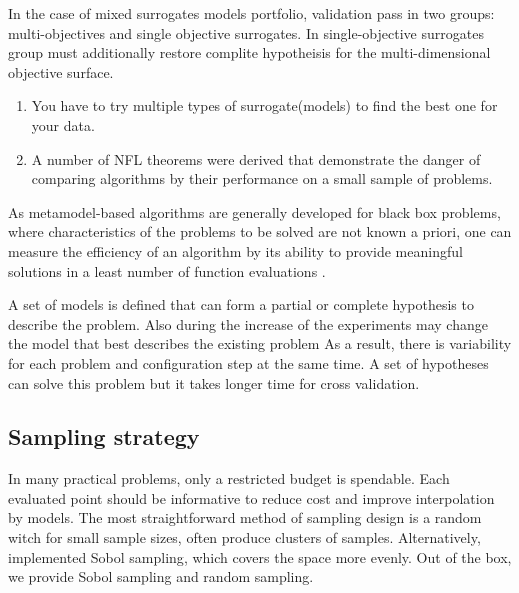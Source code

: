     In the case of mixed surrogates models portfolio, validation pass in two groups: multi-objectives and single objective surrogates. In single-objective surrogates group must additionally restore complite hypotheisis for the multi-dimensional objective surface.


    \begin{enumerate}
        \item You have to try multiple types of surrogate(models) to find the best one for your data.
        \item A number of NFL theorems were derived that demonstrate the danger of comparing algorithms by their performance on a small sample of problems.
    \end{enumerate}

    As metamodel-based algorithms are generally developed for black box problems, where characteristics of the problems to be solved are not known a priori, one can measure the efficiency of an algorithm by its ability to provide meaningful solutions in a least number of function evaluations \cite{SoftSurvey}.

    A set of models is defined that can form a partial or complete hypothesis to describe the problem. Also during the increase of the experiments may change the model that best describes the existing problem As a result, there is variability for each problem and configuration step at the same time. A set of hypotheses can solve this problem but it takes longer time for cross validation.


    \subsection{Sampling strategy} In many practical problems, only a restricted budget is spendable. Each evaluated point should be informative to reduce cost and improve interpolation by models. The most straightforward method of sampling design is a random witch for small sample sizes, often produce clusters of samples. 
    Alternatively, implemented Sobol sampling\cite{Sobol1999}, which covers the space more evenly. Out of the box, we provide Sobol sampling and random sampling.
    
    



